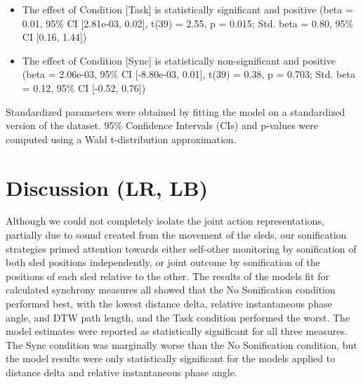 \documentclass[10pt,a4paper,onecolumn]{article}
\providecommand{\tightlist}{%
  \setlength{\itemsep}{0pt}\setlength{\parskip}{0pt}}
\begin{document}
\begin{itemize}
\tightlist
\item
  The effect of Condition {[}Task{]} is statistically significant and positive (beta = 0.01, 95\% CI {[}2.81e-03, 0.02{]}, t(39) = 2.55, p = 0.015; Std. beta = 0.80, 95\% CI {[}0.16, 1.44{]})
\item
  The effect of Condition {[}Sync{]} is statistically non-significant and positive (beta = 2.06e-03, 95\% CI {[}-8.80e-03, 0.01{]}, t(39) = 0.38, p = 0.703; Std. beta = 0.12, 95\% CI {[}-0.52, 0.76{]})
\end{itemize}

Standardized parameters were obtained by fitting the model on a standardized version of the dataset. 95\% Confidence Intervals (CIs) and p-values were computed using a Wald t-distribution approximation.

\hypertarget{discussion-lr-lb}{%
\section{Discussion (LR, LB)}\label{discussion-lr-lb}}

Although we could not completely isolate the joint action representations, partially due to sound created from the movement of the sleds, our sonification strategies primed attention towards either self-other monitoring by sonification of both sled positions independently, or joint outcome by sonification of the positions of each sled relative to the other. The results of the models fit for calculated synchrony measures all showed that the No Sonification condition performed best, with the lowest distance delta, relative instantaneous phase angle, and DTW path length, and the Task condition performed the worst. The model estimates were reported as statistically significant for all three measures. The Sync condition was marginally worse than the No Sonification condition, but the model results were only statistically significant for the models applied to distance delta and relative instantaneous phase angle.
\end{document}
